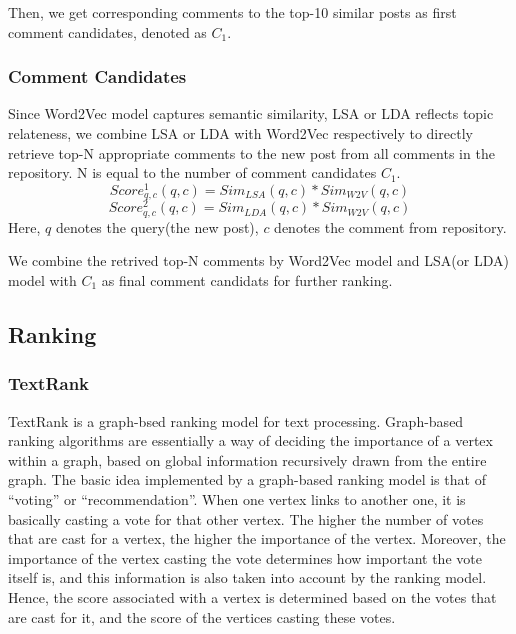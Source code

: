 \documentclass{llncs}
\begin{document}
Then, we get corresponding comments to the top-10 similar posts as first comment candidates, denoted as $C_1$.

\subsubsection{Comment Candidates}
Since Word2Vec model captures semantic similarity, LSA or LDA reflects topic relateness, we combine LSA or LDA with Word2Vec respectively to directly retrieve top-N appropriate comments to the new post from all comments in the repository. N is equal to the number of comment candidates $C_1$. 
\begin{equation}
   Score_{q,c}^1(q, c) = Sim_{LSA}(q, c) * Sim_{W2V}(q, c)
\end{equation}
\begin{equation}
   Score_{q,c}^2(q, c) = Sim_{LDA}(q, c) * Sim_{W2V}(q, c)
\end{equation}
Here, $q$ denotes the query(the new post), $c$ denotes the comment from repository.

We combine the retrived top-N comments by Word2Vec model and LSA(or LDA) model with $C_1$ as final comment candidats for further ranking.

\subsection{Ranking}

\subsubsection{TextRank}

TextRank\cite{Mihalcea} is a graph-bsed ranking model for text processing. 
Graph-based ranking algorithms are essentially a
way of deciding the importance of a vertex within
a graph, based on global information recursively
drawn from the entire graph. The basic idea implemented
by a graph-based ranking model is that
of “voting” or “recommendation”. When one vertex
links to another one, it is basically casting a vote
for that other vertex. The higher the number of votes
that are cast for a vertex, the higher the importance
of the vertex. Moreover, the importance of the vertex
casting the vote determines how important the vote
itself is, and this information is also taken into account
by the ranking model. Hence, the score associated
with a vertex is determined based on the votes
that are cast for it, and the score of the vertices casting
these votes.
\end{document}
